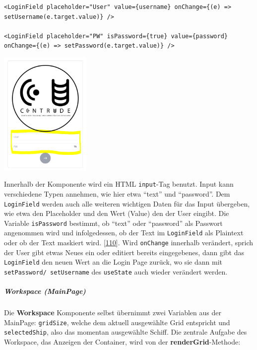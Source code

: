 \documentclass[
    headings=optiontotocandhead,%
    twoside,
    numbers=noenddot,%
    12pt, %
    titlepage, %
    parskip=full, %
    listof=leveldown, 
    numbers=noenddot, %
    a4paper,DIV=14,
    BCOR=15mm,
]{scrbook}
\newcommand{\passthrough}[1]{#1}
\let\origfigure=\figure
\let\endorigfigure=\endfigure
\renewenvironment{figure}[1][]{%
   \origfigure[H]
}{%
   \endorigfigure
}
\begin{document}
\begin{lstlisting}[caption={Nutzung der LoginField Komponente}]
<LoginField placeholder="User" value={username} onChange={(e) => setUsername(e.target.value)} />

<LoginField placeholder="PW" isPassword={true} value={password} onChange={(e) => setPassword(e.target.value)} />
\end{lstlisting}

\begin{figure}
\centering
\includegraphics[width=0.33\textwidth,height=\textheight]{img/Gekle/Loginfields.png}
\caption{LoginFields (Gelb markiert)}
\end{figure}

Innerhalb der Komponente wird ein HTML
\passthrough{\lstinline!input!}-Tag benutzt. Input kann verschiedene
Typen annehmen, wie hier etwa ``text'' und ``password''. Dem
\passthrough{\lstinline!LoginField!} werden auch alle weiteren wichtigen
Daten für das Input übergeben, wie etwa den Placeholder und den Wert
(Value) den der User eingibt. Die Variable
\passthrough{\lstinline!isPassword!} bestimmt, ob ``text'' oder
``password'' als Passwort angenommen wird und infolgedessen, ob der Text
im \passthrough{\lstinline!LoginField!} als Plaintext oder ob der Text
maskiert wird.
{[}\protect\hyperlink{ref-GeeksForGeeks-HTMLInputTag}{110}{]}. Wird
\passthrough{\lstinline!onChange!} innerhalb verändert, sprich der User
gibt etwas Neues ein oder editiert bereits eingegebenes, dann gibt das
\passthrough{\lstinline!LoginField!} den neuen Wert an die Login Page
zurück, wo sie dann mit
\passthrough{\lstinline!setPassword/ setUsername!} des
\passthrough{\lstinline!useState!} auch wieder verändert werden.

\hypertarget{workspace-mainpage}{%
\subparagraph{Workspace (MainPage)}\label{workspace-mainpage}}

Die \textbf{Workspace} Komponente selbst übernimmt zwei Variablen aus
der MainPage: \passthrough{\lstinline!gridSize!}, welche dem aktuell
ausgewählte Grid entspricht und \passthrough{\lstinline!selectedShip!},
also das momentan ausgewählte Schiff. Die zentrale Aufgabe des
Workspace, das Anzeigen der Container, wird von der
\textbf{renderGrid}-Methode:
\end{document}
